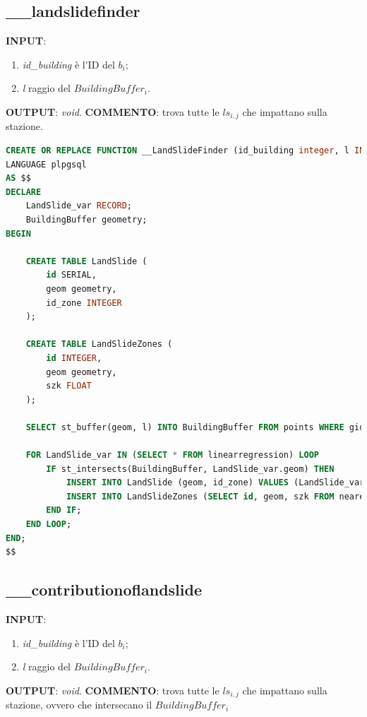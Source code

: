 \subsection{\_\_landslidefinder}
\textbf{INPUT}: 
\begin{enumerate}
	\item \textit{id\_building} è l'ID del $b_i$;
	\item \textit{l} raggio del $BuildingBuffer_i$.
\end{enumerate}
\textbf{OUTPUT}: \textit{void}. \newline
\textbf{COMMENTO}: trova tutte le $ls_{i,j}$ che impattano sulla stazione.

\begin{lstlisting}[language=SQL]
CREATE OR REPLACE FUNCTION __LandSlideFinder (id_building integer, l INTEGER) RETURNS void
LANGUAGE plpgsql
AS $$
DECLARE
	LandSlide_var RECORD;
	BuildingBuffer geometry;
BEGIN

	CREATE TABLE LandSlide (
		id SERIAL,
		geom geometry,
		id_zone INTEGER
	);

	CREATE TABLE LandSlideZones (
		id INTEGER,
		geom geometry,
		szk FLOAT
	);

	SELECT st_buffer(geom, l) INTO BuildingBuffer FROM points WHERE gid = id_building;

	FOR LandSlide_var IN (SELECT * FROM linearregression) LOOP
		IF st_intersects(BuildingBuffer, LandSlide_var.geom) THEN
			INSERT INTO LandSlide (geom, id_zone) VALUES (LandSlide_var.geom, LandSlide_var.id_zone);
			INSERT INTO LandSlideZones (SELECT id, geom, szk FROM nearestzones WHERE id = LandSlide_var.id_zone);
		END IF;
	END LOOP;
END;
$$
\end{lstlisting}

\subsection{\_\_contributionoflandslide}
\textbf{INPUT}: 
\begin{enumerate}
	\item \textit{id\_building} è l'ID del $b_i$;
	\item \textit{l} raggio del $BuildingBuffer_i$.
\end{enumerate}
\textbf{OUTPUT}: \textit{void}. \newline
\textbf{COMMENTO}: trova tutte le $ls_{i,j}$ che impattano sulla stazione, ovvero che intersecano il $BuildingBuffer_i$

